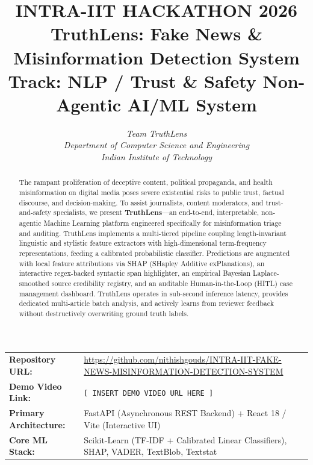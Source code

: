 \documentclass[11pt,a4paper]{article}
\title{
    \vspace{-1.5cm}
    \textbf{\Large INTRA-IIT HACKATHON 2026}\\[0.3cm]
    \textbf{\Huge TruthLens: Fake News \& Misinformation Detection System}\\[0.2cm]
    \large \textbf{Track:} NLP / Trust \& Safety \textbar{} Non-Agentic AI/ML System
}
\author{
    \textit{Team TruthLens} \\[0.3cm]
    \textit{Department of Computer Science and Engineering} \\
    \textit{Indian Institute of Technology}
}
\date{} %
\begin{document}
\maketitle

\begin{abstract}
The rampant proliferation of deceptive content, political propaganda, and health misinformation on digital media poses severe existential risks to public trust, factual discourse, and decision-making. To assist journalists, content moderators, and trust-and-safety specialists, we present \textbf{TruthLens}---an end-to-end, interpretable, non-agentic Machine Learning platform engineered specifically for misinformation triage and auditing. TruthLens implements a multi-tiered pipeline coupling length-invariant linguistic and stylistic feature extractors with high-dimensional term-frequency representations, feeding a calibrated probabilistic classifier. Predictions are augmented with local feature attributions via SHAP (SHapley Additive exPlanations), an interactive regex-backed syntactic span highlighter, an empirical Bayesian Laplace-smoothed source credibility registry, and an auditable Human-in-the-Loop (HITL) case management dashboard. TruthLens operates in sub-second inference latency, provides dedicated multi-article batch analysis, and actively learns from reviewer feedback without destructively overwriting ground truth labels.
\end{abstract}

\vspace{0.3cm}
\begin{center}
\begin{tabularx}{\textwidth}{l X}
\toprule
\textbf{Repository URL:} & \url{https://github.com/nithishgouds/INTRA-IIT-FAKE-NEWS-MISINFORMATION-DETECTION-SYSTEM} \\
\textbf{Demo Video Link:} & \texttt{[ INSERT DEMO VIDEO URL HERE ]} \\
\textbf{Primary Architecture:} & FastAPI (Asynchronous REST Backend) + React 18 / Vite (Interactive UI) \\
\textbf{Core ML Stack:} & Scikit-Learn (TF-IDF + Calibrated Linear Classifiers), SHAP, VADER, TextBlob, Textstat \\
\bottomrule
\end{tabularx}
\end{center}

\vspace{0.4cm}

\tableofcontents
\newpage
\end{document}
